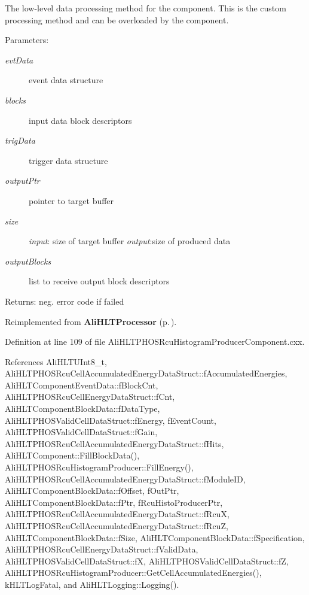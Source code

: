 The low-level data processing method for the component. This is the custom processing method and can be overloaded by the component. \begin{Desc}
\item[Parameters:]
\begin{description}
\item[{\em evt\-Data}]event data structure \item[{\em blocks}]input data block descriptors \item[{\em trig\-Data}]trigger data structure \item[{\em output\-Ptr}]pointer to target buffer \item[{\em size}]{\em input\/}: size of target buffer {\em output\/}:size of produced data \item[{\em output\-Blocks}]list to receive output block descriptors \end{description}
\end{Desc}
\begin{Desc}
\item[Returns:]neg. error code if failed \end{Desc}


Reimplemented from {\bf Ali\-HLTProcessor} {\rm (p.\,\pageref{classAliHLTProcessor_d0})}.

Definition at line 109 of file Ali\-HLTPHOSRcu\-Histogram\-Producer\-Component.cxx.

References Ali\-HLTUInt8\_\-t, Ali\-HLTPHOSRcu\-Cell\-Accumulated\-Energy\-Data\-Struct::f\-Accumulated\-Energies, Ali\-HLTComponent\-Event\-Data::f\-Block\-Cnt, Ali\-HLTPHOSRcu\-Cell\-Energy\-Data\-Struct::f\-Cnt, Ali\-HLTComponent\-Block\-Data::f\-Data\-Type, Ali\-HLTPHOSValid\-Cell\-Data\-Struct::f\-Energy, f\-Event\-Count, Ali\-HLTPHOSValid\-Cell\-Data\-Struct::f\-Gain, Ali\-HLTPHOSRcu\-Cell\-Accumulated\-Energy\-Data\-Struct::f\-Hits, Ali\-HLTComponent::Fill\-Block\-Data(), Ali\-HLTPHOSRcu\-Histogram\-Producer::Fill\-Energy(), Ali\-HLTPHOSRcu\-Cell\-Accumulated\-Energy\-Data\-Struct::f\-Module\-ID, Ali\-HLTComponent\-Block\-Data::f\-Offset, f\-Out\-Ptr, Ali\-HLTComponent\-Block\-Data::f\-Ptr, f\-Rcu\-Histo\-Producer\-Ptr, Ali\-HLTPHOSRcu\-Cell\-Accumulated\-Energy\-Data\-Struct::f\-Rcu\-X, Ali\-HLTPHOSRcu\-Cell\-Accumulated\-Energy\-Data\-Struct::f\-Rcu\-Z, Ali\-HLTComponent\-Block\-Data::f\-Size, Ali\-HLTComponent\-Block\-Data::f\-Specification, Ali\-HLTPHOSRcu\-Cell\-Energy\-Data\-Struct::f\-Valid\-Data, Ali\-HLTPHOSValid\-Cell\-Data\-Struct::f\-X, Ali\-HLTPHOSValid\-Cell\-Data\-Struct::f\-Z, Ali\-HLTPHOSRcu\-Histogram\-Producer::Get\-Cell\-Accumulated\-Energies(), k\-HLTLog\-Fatal, and Ali\-HLTLogging::Logging().

